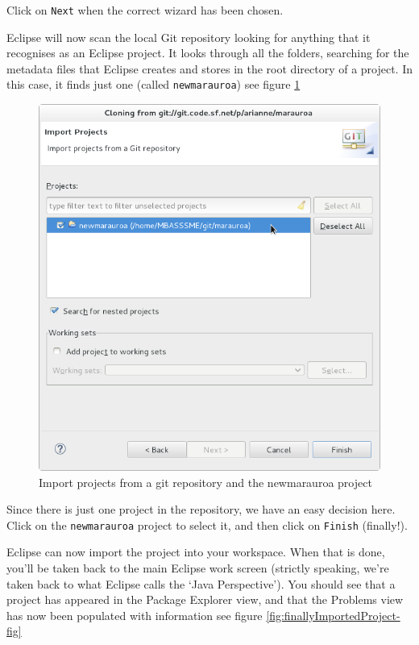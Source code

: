 \documentclass[
]{book}
\begin{document}
Click on \texttt{Next} when the correct wizard has been chosen.

Eclipse will now scan the local Git repository looking for anything that it recognises as an Eclipse project. It looks through all the folders, searching for the metadata files that Eclipse creates and stores in the root directory of a project. In this case, it finds just one (called \texttt{newmarauroa}) see figure \ref{fig:eclipseSelectProjectsToImport-fig}

\begin{figure}

{\centering \includegraphics[width=1\linewidth]{images/1.4eclipseSelectProjectsToImport} 

}

\caption{Import projects from a git repository and the newmarauroa project}\label{fig:eclipseSelectProjectsToImport-fig}
\end{figure}

Since there is just one project in the repository, we have an easy decision here. Click on the \texttt{newmarauroa} project to select it, and then click on \texttt{Finish} (finally!).

Eclipse can now import the project into your workspace. When that is done, you'll be taken back to the main Eclipse work screen (strictly speaking, we're taken back to what Eclipse calls the `Java Perspective'). You should see that a project has appeared in the Package Explorer view, and that the Problems view has now been populated with information see figure \ref{fig:finallyImportedProject-fig}
\end{document}
